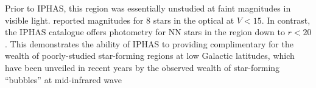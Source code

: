 \documentclass[useAMS,usenatbib]{mn2e}
\begin{document}
Prior to IPHAS, this region was essentially unstudied
at faint magnitudes in visible light.
\cite{Lahulla1985} reported magnitudes for 8 stars in the optical at 
$V < 15$. In contrast, the IPHAS catalogue offers photometry
for NN stars in the region down to $r<20$.
This demonstrates the ability of IPHAS to providing complimentary
for the wealth of poorly-studied star-forming regions
at low Galactic latitudes,
which have been unveiled in recent years
by the observed wealth of star-forming ``bubbles''
at mid-infrared wave%




\end{document}
